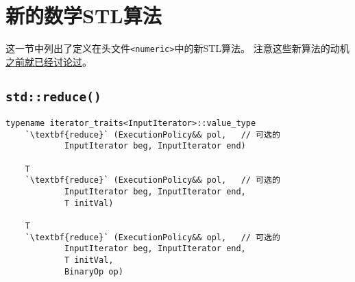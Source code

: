 \section{新的数学STL算法}
这一节中列出了定义在头文件\texttt{<numeric>}中的新STL算法。
注意这些新算法的动机\hyperref[ch22.6]{之前就已经讨论过}。

\subsection{\texttt{std::reduce()}}\label{ch23.2.1}
\begin{lstlisting}[frame=single,xleftmargin=13pt,xrightmargin=13pt]
    typename iterator_traits<InputIterator>::value_type
    `\textbf{reduce}` (ExecutionPolicy&& pol,   // 可选的
            InputIterator beg, InputIterator end)

    T
    `\textbf{reduce}` (ExecutionPolicy&& pol,   // 可选的
            InputIterator beg, InputIterator end,
            T initVal)

    T
    `\textbf{reduce}` (ExecutionPolicy&& opl,   // 可选的
            InputIterator beg, InputIterator end,
            T initVal,
            BinaryOp op)
\end{lstlisting}

